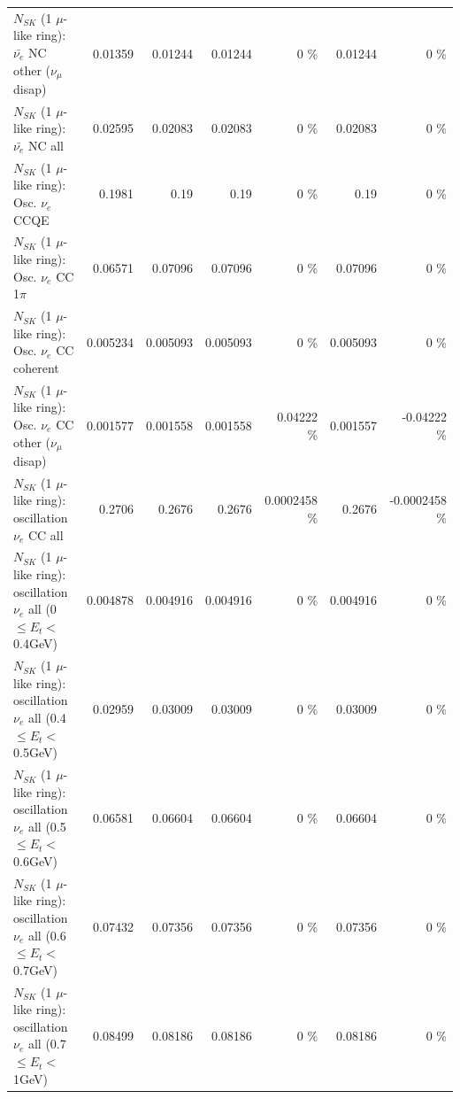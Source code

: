 \begin{table}
\begin{tabular}{| l | r | r | r  r | r  r |}
          $N_{SK}$ (1 $\mu$-like ring): $\bar{\nu_e}$ NC other ($\nu_\mu$ disap) &         0.01359 &         0.01244 &         0.01244 &        0 \%  &         0.01244 &        0 \%  \\ 
                            $N_{SK}$ (1 $\mu$-like ring): $\bar{\nu_{e}}$ NC all &         0.02595 &         0.02083 &         0.02083 &        0 \%  &         0.02083 &        0 \%  \\ 
\hline
\hline
\hline
                                 $N_{SK}$ (1 $\mu$-like ring): Osc. $\nu_e$ CCQE &          0.1981 &            0.19 &            0.19 &        0 \%  &            0.19 &        0 \%  \\ 
                            $N_{SK}$ (1 $\mu$-like ring): Osc. $\nu_e$ CC 1$\pi$ &         0.06571 &         0.07096 &         0.07096 &        0 \%  &         0.07096 &        0 \%  \\ 
                          $N_{SK}$ (1 $\mu$-like ring): Osc. $\nu_e$ CC coherent &        0.005234 &        0.005093 &        0.005093 &        0 \%  &        0.005093 &        0 \%  \\ 
           $N_{SK}$ (1 $\mu$-like ring): Osc. $\nu_e$ CC other ($\nu_\mu$ disap) &        0.001577 &        0.001558 &        0.001558 &  0.04222 \%  &        0.001557 & -0.04222 \%  \\ 
                        $N_{SK}$ (1 $\mu$-like ring): oscillation $\nu_e$ CC all &          0.2706 &          0.2676 &          0.2676 & 0.0002458 \%  &          0.2676 & -0.0002458 \%  \\ 
\hline
$N_{SK}$ (1 $\mu$-like ring): oscillation $\nu_{e}$ all (0 $\leq E_{t} <$ 0.4GeV) &        0.004878 &        0.004916 &        0.004916 &        0 \%  &        0.004916 &        0 \%  \\ 
$N_{SK}$ (1 $\mu$-like ring): oscillation $\nu_{e}$ all (0.4 $\leq E_{t} <$ 0.5GeV) &         0.02959 &         0.03009 &         0.03009 &        0 \%  &         0.03009 &        0 \%  \\ 
$N_{SK}$ (1 $\mu$-like ring): oscillation $\nu_{e}$ all (0.5 $\leq E_{t} <$ 0.6GeV) &         0.06581 &         0.06604 &         0.06604 &        0 \%  &         0.06604 &        0 \%  \\ 
$N_{SK}$ (1 $\mu$-like ring): oscillation $\nu_{e}$ all (0.6 $\leq E_{t} <$ 0.7GeV) &         0.07432 &         0.07356 &         0.07356 &        0 \%  &         0.07356 &        0 \%  \\ 
$N_{SK}$ (1 $\mu$-like ring): oscillation $\nu_{e}$ all (0.7 $\leq E_{t} <$ 1GeV) &         0.08499 &         0.08186 &         0.08186 &        0 \%  &         0.08186 &        0 \%  \\ 

\end{tabular}
\end{table}
